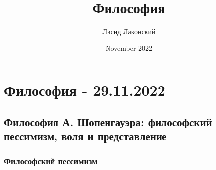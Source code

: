 \documentclass{article}
\title{Философия}
\author{Лисид Лаконский}
\date{November 2022}
\begin{document}
\maketitle
\tableofcontents
\pagebreak

\section{Философия - 29.11.2022}

\subsection{Философия А. Шопенгауэра: философский пессимизм, воля и представление}

\subsubsection{Философский пессимизм}
\end{document}
